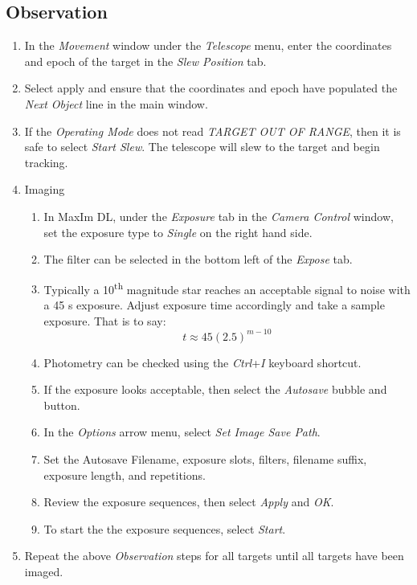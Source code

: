 \documentclass[letterpaper,12pt]{article}
\begin{document}
	\subsection{Observation}
	\begin{enumerate}
		\item In the \textit{Movement} window under the \textit{Telescope} menu, enter the coordinates and epoch of the target in the \textit{Slew Position} tab.
		\item Select apply and ensure that the coordinates and epoch have populated the \textit{Next Object} line in the main window.
		\item If the \textit{Operating Mode} does not read \textit{TARGET OUT OF RANGE}, then it is safe to select \textit{Start Slew}. The telescope will slew to the target and begin tracking.
		\item Imaging
		\begin{enumerate}
			\item In MaxIm DL, under the \textit{Exposure} tab in the \textit{Camera Control} window, set the exposure type to \textit{Single} on the right hand side.
			\item The filter can be selected in the bottom left of the \textit{Expose} tab.
			\item Typically a 10\textsuperscript{th} magnitude star reaches an acceptable signal to noise with a 45 s exposure. Adjust exposure time accordingly and take a sample exposure. That is to say:
			\[
			t \approx 45\left (2.5\right )^{m-10}
			\]
			\item Photometry can be checked using the \textit{Ctrl}+\textit{I} keyboard shortcut.
			\item If the exposure looks acceptable, then select the \textit{Autosave} bubble and button.
			\item In the \textit{Options} arrow menu, select \textit{Set Image Save Path}.
			\item Set the Autosave Filename, exposure slots, filters, filename suffix, exposure length, and repetitions.
			\item Review the exposure sequences, then select \textit{Apply} and \textit{OK}.
			\item To start the the exposure sequences, select \textit{Start}.
		\end{enumerate}
		\item Repeat the above \textit{Observation} steps for all targets until all targets have been imaged.
	\end{enumerate}
	
\end{document}
